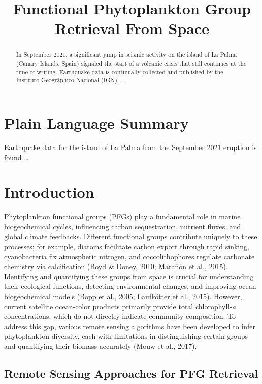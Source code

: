 \documentclass[
]{agujournal2019}
\begin{document}
\title{Functional Phytoplankton Group Retrieval From Space}



\begin{abstract}
In September 2021, a significant jump in seismic activity on the island
of La Palma (Canary Islands, Spain) signaled the start of a volcanic
crisis that still continues at the time of writing. Earthquake data is
continually collected and published by the Instituto Geográphico
Nacional (IGN). \ldots{}
\end{abstract}

\section*{Plain Language Summary}
Earthquake data for the island of La Palma from the September 2021
eruption is found \ldots{}




\section{Introduction}\label{introduction}

Phytoplankton functional groups (PFGs) play a fundamental role in marine
biogeochemical cycles, influencing carbon sequestration, nutrient
fluxes, and global climate feedbacks. Different functional groups
contribute uniquely to these processes; for example, diatoms facilitate
carbon export through rapid sinking, cyanobacteria fix atmospheric
nitrogen, and coccolithophores regulate carbonate chemistry via
calcification (Boyd \& Doney, 2010; Marañón et al., 2015). Identifying
and quantifying these groups from space is crucial for understanding
their ecological functions, detecting environmental changes, and
improving ocean biogeochemical models (Bopp et al., 2005; Laufkötter et
al., 2015). However, current satellite ocean-color products primarily
provide total chlorophyll-\emph{a} concentrations, which do not directly
indicate community composition. To address this gap, various remote
sensing algorithms have been developed to infer phytoplankton diversity,
each with limitations in distinguishing certain groups and quantifying
their biomass accurately (Mouw et al., 2017).

\subsection{Remote Sensing Approaches for PFG
Retrieval}\label{remote-sensing-approaches-for-pfg-retrieval}
\end{document}
